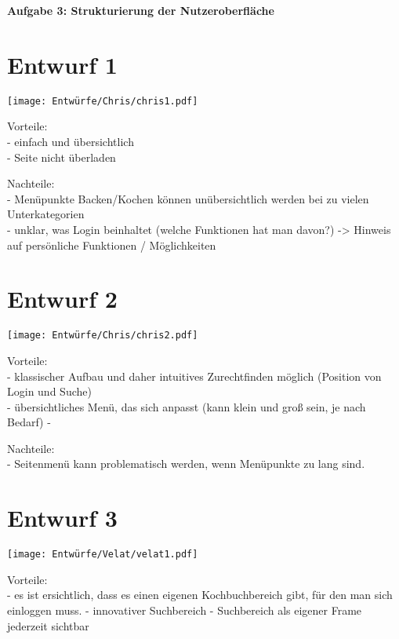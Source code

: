 \documentclass[parskip,10pt,abstracton]{scrartcl}
\renewcommand*{\maketitle}{%
	{\centering\LARGE\sffamily\bfseries Aufgabe 3: Strukturierung der Nutzeroberfläche \par}
	\vspace{3em}
}
\begin{document}
\maketitle

\section*{Entwurf 1} %

\texttt{[image: Entwürfe/Chris/chris1.pdf]}


Vorteile: \\
- einfach und übersichtlich\\
- Seite nicht überladen

Nachteile: \\
- Menüpunkte Backen/Kochen können unübersichtlich werden bei zu vielen Unterkategorien\\
- unklar, was Login beinhaltet (welche Funktionen hat man davon?) -> Hinweis auf persönliche Funktionen / Möglichkeiten

\section*{Entwurf 2} %

\texttt{[image: Entwürfe/Chris/chris2.pdf]}

Vorteile:\\
- klassischer Aufbau und daher intuitives Zurechtfinden möglich (Position von Login und Suche) \\
- übersichtliches Menü, das sich anpasst (kann klein und groß sein, je nach Bedarf)
-

Nachteile:\\
- Seitenmenü kann problematisch werden, wenn Menüpunkte zu lang sind.


\section*{Entwurf 3} %

\texttt{[image: Entwürfe/Velat/velat1.pdf]}


Vorteile:\\
- es ist ersichtlich, dass es einen eigenen Kochbuchbereich gibt, für den man sich einloggen muss.
- innovativer Suchbereich
- Suchbereich als eigener Frame jederzeit sichtbar
\end{document}
